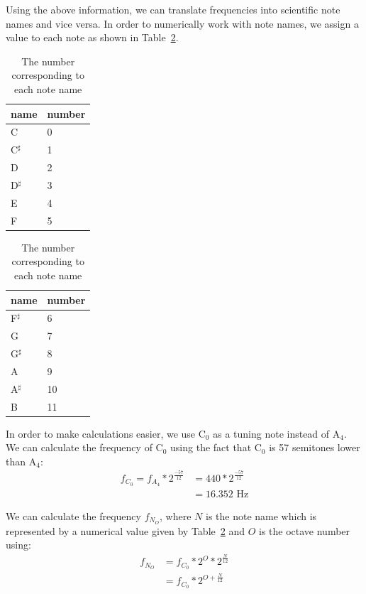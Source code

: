 \documentclass[10pt,twocolumn]{article}
\newcommand{\note}[2]{#1${}_{#2}$}
\newcommand{\notesharp}[2]{#1${}_{#2}^{\sharp}$}
\begin{document}
Using the above information, we can translate frequencies into scientific note names and vice versa. In order to numerically work with note names, we assign a value to each note as shown in Table~\ref{tab:notenames}.
\begin{table}[H]
    \hfill
    \begin{center}
        \begin{tabular}{l|l}
            name & number \\
            \hline
            \note{C}{}      & 0 \\
            \notesharp{C}{} & 1 \\
            \note{D}{}      & 2 \\
            \notesharp{D}{} & 3 \\
            \note{E}{}      & 4 \\
            \note{F}{}      & 5
        \end{tabular}
        \qquad
        \begin{tabular}{l|l}
            name & number \\
            \hline
            \notesharp{F}{} & 6 \\
            \note{G}{}      & 7 \\
            \notesharp{G}{} & 8 \\
            \note{A}{}      & 9 \\
            \notesharp{A}{} & 10 \\
            \note{B}{}      & 11
        \end{tabular}
    \end{center}
    \hfill
    \caption{The number corresponding to each note name}
    \label{tab:notenames}
\end{table}
In order to make calculations easier, we use \note{C}{0} as a tuning note instead of \note{A}{4}. We can calculate the frequency of \note{C}{0} using the fact that \note{C}{0} is 57 semitones lower than \note{A}{4}:
\begin{align*}
    f_{C_0} = f_{A_4} * 2^{\frac{-57}{12}} &= 440 * 2^{\frac{-57}{12}} \\
                                           &= 16.352 \text{ Hz}
\end{align*}

We can calculate the frequency $f_{N_O}$, where $N$ is the note name which is represented by a numerical value given by Table~\ref{tab:notenames} and $O$ is the octave number using:
\begin{align*}
    f_{N_O} &= f_{C_0} * 2^O * 2^{\frac{N}{12}} \\
            &= f_{C_0} * 2^{O + \frac{N}{12}}
\end{align*}
\end{document}
